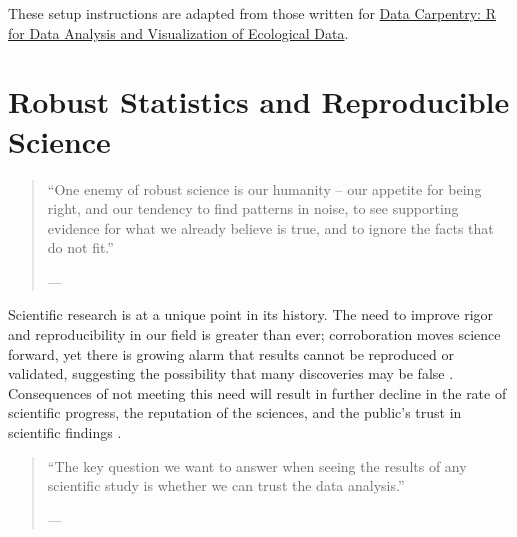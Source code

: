 \documentclass[12pt, krantz2,]{krantz}
\theoremstyle{definition}
\theoremstyle{definition}
\theoremstyle{definition}
\newcommand{\1}{\mathbbm{1}}
\begin{document}
These setup instructions are adapted from those written for \href{http://www.datacarpentry.org/R-ecology-lesson/}{Data Carpentry: R
for Data Analysis and Visualization of Ecological
Data}.

\hypertarget{robust}{%
\chapter{Robust Statistics and Reproducible Science}\label{robust}}

\begin{quote}
``One enemy of robust science is our humanity -- our appetite for
being right, and our tendency to find patterns in noise, to see supporting
evidence for what we already believe is true, and to ignore the facts that do
not fit.''

--- \citet{naturenews_2015}
\end{quote}

Scientific research is at a unique point in its history. The need to improve
rigor and reproducibility in our field is greater than ever; corroboration moves
science forward, yet there is growing alarm that results cannot be reproduced or
validated, suggesting the possibility that many discoveries may be false
\citep{baker2016there}. Consequences of not meeting this need will result in further
decline in the rate of scientific progress, the reputation of the sciences, and
the public's trust in scientific findings \citep{munafo2017manifesto, naturenews2_2015}.

\begin{quote}
``The key question we want to answer when seeing the results of any scientific
study is whether we can trust the data analysis.''

--- \citet{peng2015reproducibility}
\end{quote}
\end{document}

